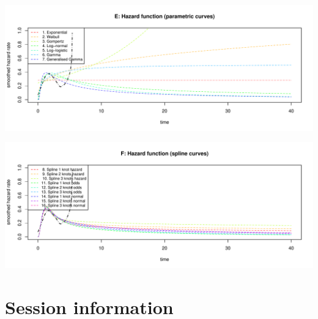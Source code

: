 \documentclass[
]{article}
\begin{document}
\begin{flushleft}\includegraphics[height=0.29\textheight]{Images/validate_extrapolation3-5} \end{flushleft}

\begin{flushleft}\includegraphics[height=0.29\textheight]{Images/validate_extrapolation3-6} \end{flushleft}

\newpage

\hypertarget{session-information}{%
\section{Session information}\label{session-information}}
\end{document}
